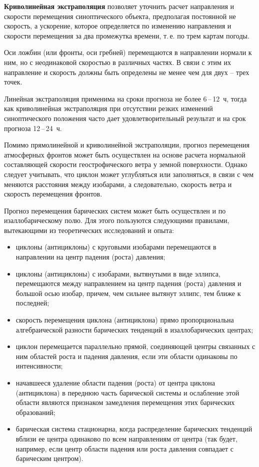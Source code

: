 \documentclass[a4paper, 12pt, twoside, final, book, russian, fittopage, cyremdash, openright]{ncc}
\newcommand{\otdo}{\,--\,}
\begin{document}
\textbf{Криволинейная экстраполяция} позволяет уточнить расчет направления и скорости
перемещения синоптического объекта, предполагая постоянной не
скорость, а ускорение, которое определяется по изменению направления и
скорости перемещения за два промежутка времени, т.\,е. по трем картам
погоды.

Оси ложбин (или фронты, оси гребней) перемещаются в направлении
нормали к ним, но с неодинаковой скоростью в различных частях. В связи
с этим их направление и скорость должны быть определены не менее чем
для двух -- трех точек.

Линейная экстраполяция применима на сроки прогноза не более 6\otdo12~ч,
тогда как криволинейная экстраполяция при отсутствии резких изменений
синоптического положения часто дает удовлетворительный результат и на
срок прогноза 12\otdo24~ч.

Помимо прямолинейной и криволинейной экстраполяции, прогноз
перемещения атмосферных фронтов может быть осуществлен на основе
расчета нормальной составляющей скорости геострофического ветра у
земной поверхности. Однако следует учитывать, что циклон может
углубляться или заполняться, в связи с чем меняются расстояния между
изобарами, а следовательно, скорость ветра и скорость перемещения
фронтов.

Прогноз перемещения барических систем может быть осуществлен и по
изаллобарическому полю. Для этого пользуются следующими правилами,
вытекающими из теоретических исследований и опыта:
\begin{itemize}
\item циклоны (антициклоны) с круговыми изобарами перемещаются в
  направлении на центр падения (роста) давления;
\item циклоны (антициклоны) с изобарами, вытянутыми в виде эллипса,
  перемещаются между направлением на центр падения (роста) давления и
  большой осью изобар, причем, чем сильнее вытянут эллипс, тем ближе к
  последней;
\item скорость перемещения циклона (антициклона) прямо пропорциональна
  алгебраической разности барических тенденций в изаллобарических
  центрах;
\item циклон перемещается параллельно прямой, соединяющей центры
  связанных с ним областей роста и падения давления, если эти области
  одинаковы по интенсивности;
\item начавшееся удаление области падения (роста) от центра циклона
  (антициклона) в переднюю часть барической системы и ослабление этой
  области являются признаком замедления перемещения этих барических
  образований;
\item барическая система стационарна, когда распределение барических
  тенденций вблизи ее центра одинаково по всем направлениям от центра
  (так будет, например, если центр области падения или роста давления
  совпадает с барическим центром).
\end{itemize}
\end{document}
